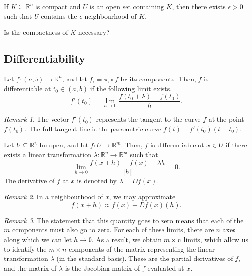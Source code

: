 \documentclass[11pt]{article}
\newcommand{\R}{\mathbb{R}}
\newcommand{\norm}[1]{\Vert #1 \Vert}
\theoremstyle{definition}
\theoremstyle{remark}
\newtheorem*{remark}{Remark}
\numberwithin{equation}{section}
\begin{document}
    \begin{exercise}
        If $K \subseteq \R^n$ is compact and $U$ is an open set containing $K$, then
        there exists $\epsilon > 0$ such that $U$ contains the $\epsilon$
        neighbourhood of $K$.

        Is the compactness of $K$ necessary?
    \end{exercise}
    
    \subsection{Differentiability}
    \begin{definition}
        Let $f \colon (a, b) \to \R^n$, and let $f_i = \pi_i\circ f$ be its
        components. Then, $f$ is differentiable at $t_0 \in (a, b)$ if the following
        limit exists. \[
            f'(t_0) = \lim_{h \to 0} \frac{f(t_0 + h) - f(t_0)}{h}.
        \] 
        \begin{remark}
            The vector $f'(t_0)$ represents the tangent to the curve $f$ at the point
            $f(t_0)$. The full tangent line is the parametric curve $f(t) + f'(t_0)(t
            - t_0)$.
        \end{remark}
    \end{definition}

    \begin{definition}
        Let $U \subseteq \R^n$ be open, and let $f\colon U \to \R^m$. Then, $f$ is
        differentiable at $x \in U$ if there exists a linear transformation
        $\lambda\colon \R^n \to \R^m$ such that \[
            \lim_{h \to 0} \frac{f(x + h) - f(x) - \lambda h}{\norm{h}} = 0.
        \] The derivative of $f$ at $x$ is denoted by $\lambda = Df(x)$.
        \begin{remark}
            In a neighbourhood of $x$, we may approximate \[
                f(x + h) \approx f(x) + Df(x)(h).
            \] 
        \end{remark}
        \begin{remark}
            The statement that this quantity goes to zero means that each of the $m$
            components must also go to zero. For each of these limits, there are $n$
            axes along which we can let $h \to 0$. As a result, we obtain $m\times n$
            limits, which allow us to identify the $m\times n$ components of the
            matrix representing the linear transformation $\lambda$ (in the standard
            basis). These are the partial derivatives of $f$, and the matrix of
            $\lambda$ is the Jacobian matrix of $f$ evaluated at $x$.
        \end{remark}
    \end{definition}
\end{document}
